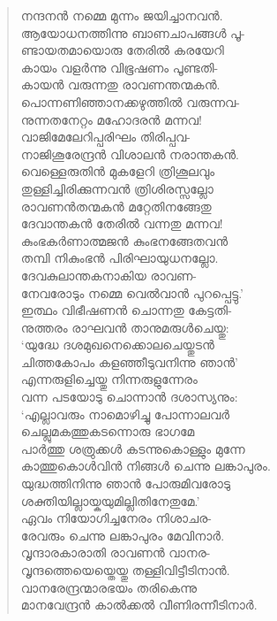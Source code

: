 \begin{verse}
നന്ദനന്‍ നമ്മെ മുന്നം ജയിച്ചാനവന്‍.\\
ആയോധനത്തിന്നു ബാണചാപങ്ങള്‍ പൂ-\\
ണ്ടായതമായൊരു തേരില്‍ കരയേറി\\
കായം വളര്‍ന്നു വിഭൂഷണം പൂണ്ടതി-\\
കായന്‍ വരുന്നതു രാവണന്തന്മകന്‍.\\
പൊന്നണിഞ്ഞാനക്കഴുത്തില്‍ വരുന്നവ-\\
നുന്നതനേറ്റം മഹോദരന്‍ മന്നവ!\\
വാജിമേലേറിപ്പരിഘം തിരിപ്പവ-\\
നാജിശൂരേന്ദ്രന്‍ വിശാലന്‍ നരാന്തകന്‍.\\
വെള്ളെരുതിന്‍ മുകളേറി ത്രിശൂലവും\\
തുള്ളിച്ചിരിക്കുന്നവന്‍ ത്രിശിരസ്സല്ലോ\\
രാവണന്‍തന്മകന്‍ മറ്റേതിനങ്ങേതു\\
ദേവാന്തകന്‍ തേരില്‍ വന്നതു മന്നവ!\\
കുംഭകര്‍ണാത്മജന്‍ കുംഭനങ്ങേതവന്‍\\
തമ്പി നികുംഭന്‍ പിരിഘായുധനല്ലോ.\\
ദേവകുലാന്തകനാകിയ രാവണ-\\
നേവരോടും നമ്മെ വെല്‍വാന്‍ പുറപ്പെട്ടു.’\\
ഇത്ഥം വിഭീഷണന്‍ ചൊന്നതു കേട്ടതി-\\
നുത്തരം രാഘവന്‍ താനുമരുള്‍ചെയ്തു:\\
‘യുദ്ധേ ദശമുഖനെക്കൊലചെയ്തുടന്‍\\
ചിത്തകോപം കളഞ്ഞീടുവനിന്നു ഞാന്‍’\\
എന്നരുളിച്ചെയ്തു നിന്നരുളുന്നേരം\\
വന്ന പടയോടു ചൊന്നാന്‍ ദശാസ്യനും:\\
‘എല്ലാവരും നാമൊഴിച്ചു പോന്നാലവര്‍\\
ചെല്ലുമകത്തുകടന്നൊരു ഭാഗമേ\\
പാര്‍ത്തു ശത്രുക്കള്‍ കടന്നുകൊള്ളും മുന്നേ\\
കാത്തുകൊള്‍വിന്‍ നിങ്ങള്‍ ചെന്നു ലങ്കാപുരം.\\
യുദ്ധത്തിനിന്നു ഞാന്‍ പോരുമിവരോടു\\
ശക്തിയില്ലായ്കയുമില്ലിതിനേതുമേ.’\\
ഏവം നിയോഗിച്ചനേരം നിശാചര-\\
രേവരും ചെന്നു ലങ്കാപുരം മേവിനാര്‍.\\
വൃന്ദാരകാരാതി രാവണന്‍ വാനര-\\
വൃന്ദത്തെയെയ്തെയ്തു തള്ളിവിട്ടീടിനാന്‍.\\
വാനരേന്ദ്രന്മാരഭയം തരികെന്നു\\
മാനവേന്ദ്രന്‍ കാല്‍ക്കല്‍ വീണിരന്നീടിനാര്‍.\\

\end{verse}
